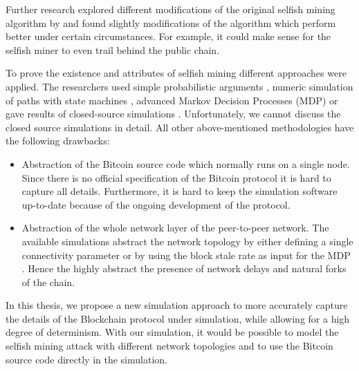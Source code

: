 \documentclass{scrartcl}
\begin{document}
Further research \cite{nayak2016stubborn,sapirshtein2016optimal, gervais2015tampering, gervais2016security, bahack2013theoretical} explored different modifications of the original selfish mining algorithm by \citeauthor{eyal2014majority} and found slightly modifications of the algorithm which perform better under certain circumstances.
For example, it could make sense for the selfish miner to even trail behind the public chain.

To prove the existence and attributes of selfish mining different approaches were applied.
The researchers used simple probabilistic arguments \cite{eyal2014majority, bahack2013theoretical}, numeric simulation of paths with state machines \cite{gervais2015tampering, nayak2016stubborn}, advanced Markov Decision Processes (MDP) \cite{sapirshtein2016optimal, gervais2016security} or gave results of closed-source simulations \cite{eyal2014majority, sapirshtein2016optimal}.
Unfortunately, we cannot discuss the closed source simulations in detail.
All other above-mentioned methodologies have the following drawbacks:
\begin{itemize}
\item Abstraction of the Bitcoin source code which normally runs on a single node.
Since there is no official specification of the Bitcoin protocol it is hard to capture all details.
Furthermore, it is hard to keep the simulation software up-to-date because of the ongoing development of the protocol.
\item Abstraction of the whole network layer of the peer-to-peer network.
The available simulations abstract the network topology by either defining a single connectivity parameter \cite{eyal2014majority, bahack2013theoretical, nayak2016stubborn, sapirshtein2016optimal, gervais2015tampering} or by using the block stale rate as input for the MDP \cite{gervais2016security}.
Hence the highly abstract the presence of network delays and natural forks of the chain.
\end{itemize}

In this thesis, we propose a new simulation approach to more accurately capture the details of the Blockchain protocol under simulation, while allowing for a high degree of determinism.
With our simulation, it would be possible to model the selfish mining attack with different network topologies and to use the Bitcoin source code directly in the simulation.
\end{document}
